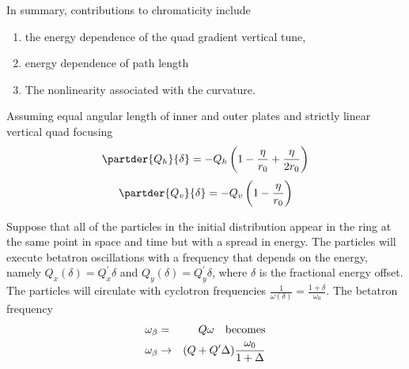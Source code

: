 \documentclass[10pt]{article}
\begin{document}
In summary, contributions to chromaticity include \begin{enumerate}
\item the energy dependence of the quad gradient
vertical tune,  
\item energy dependence of path length
\item The nonlinearity associated with the curvature.
\end{enumerate}
Assuming equal angular length of inner and outer plates and strictly linear vertical quad focusing
$$\partder{Q_{h}}{\delta} = -Q_{h}\left(1 -\frac{\eta}{r_0} +\frac{\eta}{2r_0}\right)$$
$$ \partder{Q_v}{\delta}= -Q_{v}\left(1-\frac{\eta}{r_0}\right)$$




Suppose that all of the particles in the initial distribution appear in the ring at the
same point in space and time but with a spread in energy. The particles will execute betatron
oscillations with a frequency that depends on the energy, namely $Q_x(\delta) = Q^\prime_x\delta$
and $Q_y(\delta) = Q_y^\prime \delta$, where $\delta$ is the fractional energy offset. 
The particles will circulate with cyclotron frequencies
$\frac{1}{\omega(\delta)} = \frac{1+\delta}{\omega_0}$.
The betatron frequency
\begin{eqnarray*}
\omega_\beta &=& Q\omega \ \ \ {\rm becomes} \\
\omega_\beta &\rightarrow& (Q+Q^\prime\Delta)\frac{\omega_0}{1+\Delta}\\  
\end{eqnarray*}
\end{document}
